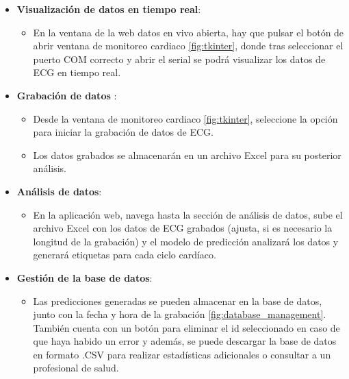 \begin{itemize}
    \item \textbf{Visualización de datos en tiempo real}:
    \begin{itemize}
        \item En la ventana de la web datos en vivo abierta, hay que pulsar el botón de abrir ventana de monitoreo cardiaco \ref{fig:tkinter}, donde tras seleccionar el puerto COM correcto y abrir el serial se podrá visualizar los datos de ECG en tiempo real.
    \end{itemize}

    \item \textbf{Grabación de datos }:
    \begin{itemize}
        \item Desde la ventana de monitoreo cardiaco \ref{fig:tkinter}, seleccione la opción para iniciar la grabación de datos de ECG.
        \item Los datos grabados se almacenarán en un archivo Excel para su posterior análisis.
    \end{itemize}

    \item \textbf{Análisis de datos}:
    \begin{itemize}
        \item En la aplicación web, navega hasta la sección de análisis de datos, sube el archivo Excel con los datos de ECG grabados (ajusta, si es necesario la longitud de la grabación) y el modelo de predicción analizará los datos y generará etiquetas para cada ciclo cardíaco.
    \end{itemize}

    \item \textbf{Gestión de la base de datos}:
    \begin{itemize}
        \item Las predicciones generadas se pueden almacenar en la base de datos, junto con la fecha y hora de la grabación \ref{fig:database_management}. También cuenta con un botón para eliminar el id seleccionado en caso de que haya habido un error y además, se puede descargar la base de datos en formato .CSV para realizar estadísticas adicionales o consultar a un profesional de salud.
    \end{itemize}
\end{itemize}

